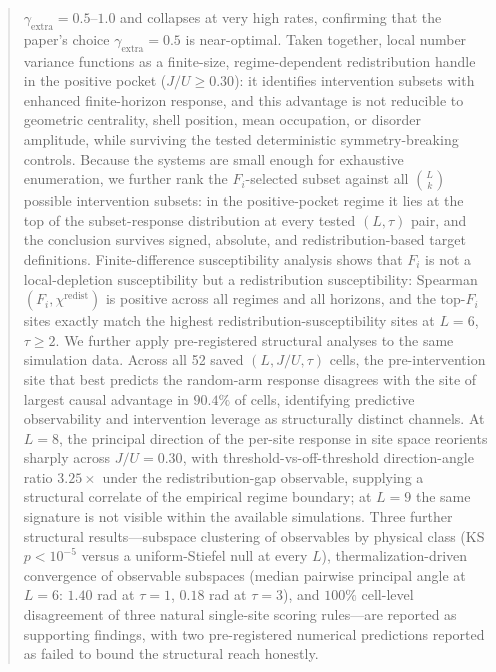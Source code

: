 \documentclass[aps,prresearch,reprint,amsmath,amssymb,longbibliography,floatfix]{revtex4-2}
\newcommand{\Fi}{F_i}
\begin{document}
\begin{abstract}
$\gamma_{\mathrm{extra}}=0.5$--$1.0$ and collapses at very high rates,
confirming that the paper's choice $\gamma_{\mathrm{extra}}=0.5$ is
near-optimal.
Taken together, local number variance functions as a finite-size,
regime-dependent redistribution handle in the positive pocket
($J/U\geq0.30$): it identifies intervention subsets with enhanced
finite-horizon response, and this advantage is not reducible to geometric
centrality, shell position, mean occupation, or disorder amplitude, while
surviving the tested deterministic symmetry-breaking controls.
Because the systems are small enough for exhaustive enumeration, we further
rank the $\Fi$-selected subset against all $\binom{L}{k}$ possible
intervention subsets: in the positive-pocket regime it lies at the top of
the subset-response distribution at every tested $(L,\tau)$ pair, and the
conclusion survives signed, absolute, and redistribution-based target
definitions.
Finite-difference susceptibility analysis shows that $\Fi$ is not a
local-depletion susceptibility but a redistribution susceptibility:
Spearman$(\Fi,\chi^{\mathrm{redist}})$ is positive across all regimes and
all horizons, and the top-$\Fi$ sites exactly match the highest
redistribution-susceptibility sites at $L=6$, $\tau\geq2$.
We further apply pre-registered structural analyses to the same
simulation data. Across all 52 saved $(L,J/U,\tau)$ cells, the
pre-intervention site that best predicts the random-arm response
disagrees with the site of largest causal advantage in $90.4\%$ of
cells, identifying predictive observability and intervention leverage
as structurally distinct channels. At $L=8$, the principal direction of
the per-site response in site space reorients sharply across
$J/U=0.30$, with threshold-vs-off-threshold direction-angle ratio
$3.25\times$ under the redistribution-gap observable, supplying a
structural correlate of the empirical regime boundary; at $L=9$ the
same signature is not visible within the available simulations.
Three further structural results---subspace clustering of observables
by physical class (KS $p<10^{-5}$ versus a uniform-Stiefel null at every
$L$), thermalization-driven convergence of observable subspaces (median
pairwise principal angle at $L=6$: $1.40$ rad at $\tau=1$, $0.18$ rad
at $\tau=3$), and $100\%$ cell-level disagreement of three natural
single-site scoring rules---are reported as supporting findings, with
two pre-registered numerical predictions reported as failed to bound
the structural reach honestly.
\end{abstract}
\end{document}
